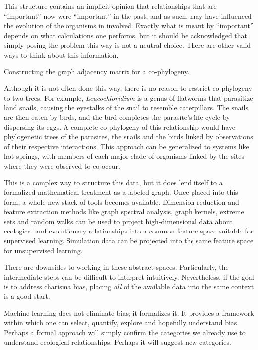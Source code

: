 This structure contains an implicit opinion that relationships that are ``important'' now were ``important'' in the past, and as such, may have influenced the evolution of the organisms in involved. Exactly what is meant by ``important'' depends on what calculations one performs, but it should be acknowledged that simply posing the problem this way is not a neutral choice. There are other valid ways to think about this information.


Constructing the graph adjacency matrix for a co-phylogeny.


Although it is not often done this way, there is no reason to restrict co-phylogeny to two trees. For example, {\em Leucochloridium} is a genus of flatworms that parasitize land snails, causing the eyestalks of the snail to resemble caterpillars. The snails are then eaten by birds, and the bird completes the parasite's life-cycle by dispersing its eggs. A complete co-phylogeny of this relationship would have phylogenetic trees of the parasites, the snails and the birds linked by observations of their respective interactions. This approach can be generalized to systems like hot-springs, with members of each major clade of organisms linked by the sites where they were observed to co-occur.

This is a complex way to structure this data, but it does lend itself to a formalized mathematical treatment as a labeled graph. Once placed into this form, a whole new stack of tools becomes available. Dimension reduction and feature extraction methods like graph spectral analysis, graph kernels, extreme sets and random walks can be used to project high-dimensional data about ecological and evolutionary relationships into a common feature space suitable for supervised learning. Simulation data can be projected into the same feature space for unsupervised learning.

There are downsides to working in these abstract spaces. Particularly, the intermediate steps can be difficult to interpret intuitively. Nevertheless, if the goal is to address charisma bias, placing {\em all} of the available data into the same context is a good start. 

Machine learning does not eliminate bias; it formalizes it. It provides a framework within which one can select, quantify, explore and hopefully understand bias. Perhaps a formal approach will simply confirm the categories we already use to understand ecological relationships. Perhaps it will suggest new categories.